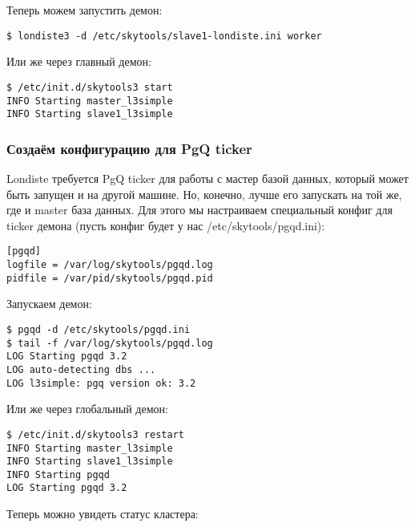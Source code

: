 Теперь можем запустить демон:

\begin{lstlisting}[label=lst:londiste-replica11,caption=Запускаем демон для slave базы]
$ londiste3 -d /etc/skytools/slave1-londiste.ini worker
\end{lstlisting}

Или же через главный демон:

\begin{lstlisting}[label=lst:londiste-replica12,caption=Запускаем демон для slave базы]
$ /etc/init.d/skytools3 start
INFO Starting master_l3simple
INFO Starting slave1_l3simple
\end{lstlisting}


\subsubsection{Создаём конфигурацию для PgQ ticker}

Londiste требуется PgQ ticker для работы с мастер базой данных, который может быть запущен и на другой машине. Но, конечно, лучше его запускать на той же, где и master база данных. Для этого мы настраиваем специальный конфиг для ticker демона (пусть конфиг будет у нас /etc/skytools/pgqd.ini):

\begin{lstlisting}[label=lst:londiste-replica13,caption=PgQ ticker конфиг]
[pgqd]
logfile = /var/log/skytools/pgqd.log
pidfile = /var/pid/skytools/pgqd.pid
\end{lstlisting}

Запускаем демон:

\begin{lstlisting}[label=lst:londiste-replica11,caption=Запускаем PgQ ticker]
$ pgqd -d /etc/skytools/pgqd.ini
$ tail -f /var/log/skytools/pgqd.log
LOG Starting pgqd 3.2
LOG auto-detecting dbs ...
LOG l3simple: pgq version ok: 3.2
\end{lstlisting}

Или же через глобальный демон:

\begin{lstlisting}[label=lst:londiste-replica12,caption=Запускаем PgQ ticker]
$ /etc/init.d/skytools3 restart
INFO Starting master_l3simple
INFO Starting slave1_l3simple
INFO Starting pgqd
LOG Starting pgqd 3.2
\end{lstlisting}

Теперь можно увидеть статус кластера:

